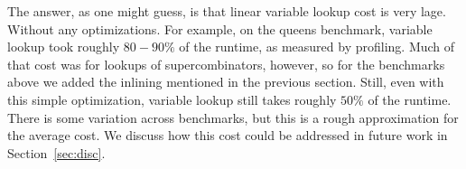 The answer, as one might guess, is that linear variable lookup cost is very
lage. Without any optimizations. For example, on the queens benchmark, variable
lookup took roughly $80-90\%$ of the runtime, as measured by profiling. Much
of that cost was for lookups of supercombinators, however, so for the benchmarks
above we added the inlining mentioned in the previous section. Still, even with
this simple optimization, variable lookup still takes roughly $50\%$ of the
runtime. There is some variation across benchmarks, but this is a rough
approximation for the average cost. We discuss how this cost could be addressed
in future work in Section~\ref{sec:disc}.



